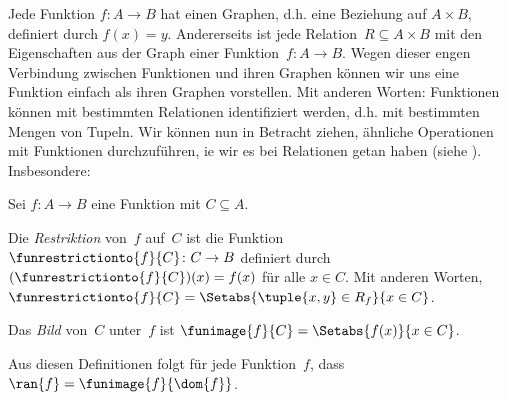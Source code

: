 \documentclass[../../../include/open-logic-section]{subfiles}
\begin{document}
\begin{explain}
Jede Funktion $f\colon A \to B$ hat einen Graphen, d.h. eine Beziehung auf $A
\times B$, definiert durch $f(x) = y$. Andererseits ist jede Relation~$R
\subseteq A \times B$ mit den Eigenschaften aus
 der Graph einer Funktion~$f \colon A \to
B$. Wegen dieser engen Verbindung zwischen Funktionen und ihren
Graphen können wir uns eine Funktion einfach als ihren Graphen vorstellen.
Mit anderen Worten: Funktionen können mit bestimmten Relationen identifiziert werden, d.h. mit
bestimmten Mengen von Tupeln.  
Wir können nun in Betracht ziehen, ähnliche Operationen mit Funktionen durchzuführen, 
ie wir es bei Relationen getan haben (siehe
). Insbesondere:
\end{explain}

\begin{defn}
Sei $f \colon A \to B$ eine Funktion mit $C\subseteq A$.

Die \emph{Restriktion} von~$f$ auf~$C$ ist die
Funktion~$\funrestrictionto{f}{C}\colon C \to B$ definiert durch
$(\funrestrictionto{f}{C})(x) = f(x)$ für alle $x \in C$.
Mit anderen Worten, $\funrestrictionto{f}{C} = \Setabs{\tuple{x, y} \in R_f}{x \in
C}$.

Das \emph{Bild} von~$C$ unter~$f$ ist $\funimage{f}{C} =
\Setabs{f(x)}{x \in C}$.
\end{defn}

\begin{explain}
Aus diesen Definitionen folgt für jede Funktion~$f$, dass $\ran{f} =
\funimage{f}{\dom{f}}$.
\end{explain}
\end{document}
